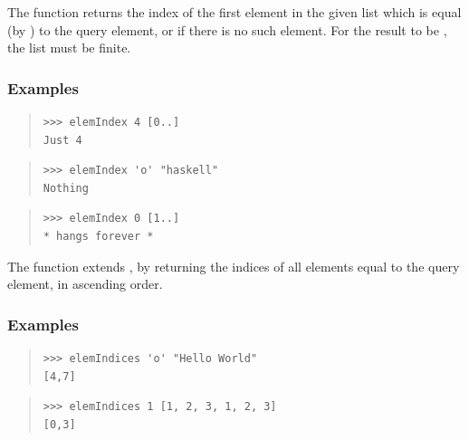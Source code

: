 \begin{haddockdesc}
\item[\begin{tabular}{@{}l}
elemIndex :: Eq a => a -> {\char 91}a{\char 93} -> Maybe Int
\end{tabular}]
{\haddockbegindoc
The  function returns the index of the first element
 in the given list which is equal (by \haddockid{==}) to the query element,
 or  if there is no such element.
 For the result to be , the list must be finite.\par
\subsubsection*{\textbf{Examples}}
\begin{quote}
{\haddockverb\begin{verbatim}
>>> elemIndex 4 [0..]
Just 4

\end{verbatim}}
\end{quote}
\begin{quote}
{\haddockverb\begin{verbatim}
>>> elemIndex 'o' "haskell"
Nothing

\end{verbatim}}
\end{quote}
\begin{quote}
{\haddockverb\begin{verbatim}
>>> elemIndex 0 [1..]
* hangs forever *

\end{verbatim}}
\end{quote}}
\end{haddockdesc}
\begin{haddockdesc}
\item[\begin{tabular}{@{}l}
elemIndices :: Eq a => a -> {\char 91}a{\char 93} -> {\char 91}Int{\char 93}
\end{tabular}]
{\haddockbegindoc
The  function extends , by returning the
 indices of all elements equal to the query element, in ascending order.\par
\subsubsection*{\textbf{Examples}}
\begin{quote}
{\haddockverb\begin{verbatim}
>>> elemIndices 'o' "Hello World"
[4,7]

\end{verbatim}}
\end{quote}
\begin{quote}
{\haddockverb\begin{verbatim}
>>> elemIndices 1 [1, 2, 3, 1, 2, 3]
[0,3]

\end{verbatim}}
\end{quote}}
\end{haddockdesc}
